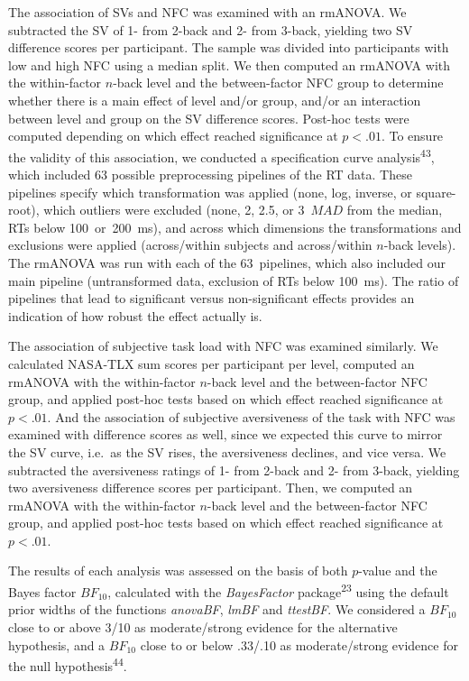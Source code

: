 \documentclass[
  man,floatsintext]{apa6}
\begin{document}
The association of SVs and NFC was examined with an rmANOVA.
We subtracted the SV of 1- from 2-back and 2- from 3-back, yielding two SV difference scores per participant.
The sample was divided into participants with low and high NFC using a median split.
We then computed an rmANOVA with the within-factor \(n\)-back level and the between-factor NFC group to determine whether there is a main effect of level and/or group, and/or an interaction between level and group on the SV difference scores.
Post-hoc tests were computed depending on which effect reached significance at \(p<.01\).
To ensure the validity of this association, we conducted a specification curve analysis\textsuperscript{43}, which included 63 possible preprocessing pipelines of the RT data.
These pipelines specify which transformation was applied (none, log, inverse, or square-root), which outliers were excluded (none, 2, 2.5, or 3~\(MAD\) from the median, RTs below 100~or~200~ms), and across which dimensions the transformations and exclusions were applied (across/within subjects and across/within \(n\)-back levels).
The rmANOVA was run with each of the 63~pipelines, which also included our main pipeline (untransformed data, exclusion of RTs below 100~ms).
The ratio of pipelines that lead to significant versus non-significant effects provides an indication of how robust the effect actually is.

The association of subjective task load with NFC was examined similarly.
We calculated NASA-TLX sum scores per participant per level, computed an rmANOVA with the within-factor \(n\)-back level and the between-factor NFC group, and applied post-hoc tests based on which effect reached significance at \(p<.01\).
And the association of subjective aversiveness of the task with NFC was examined with difference scores as well, since we expected this curve to mirror the SV curve, i.e.~as the SV rises, the aversiveness declines, and vice versa.
We subtracted the aversiveness ratings of 1- from 2-back and 2- from 3-back, yielding two aversiveness difference scores per participant.
Then, we computed an rmANOVA with the within-factor \(n\)-back level and the between-factor NFC group, and applied post-hoc tests based on which effect reached significance at \(p<.01\).

The results of each analysis was assessed on the basis of both \(p\)-value and the Bayes factor \(BF_{10}\), calculated with the \emph{BayesFactor} package\textsuperscript{23} using the default prior widths of the functions \emph{anovaBF}, \emph{lmBF} and \emph{ttestBF}.
We considered a \(BF_{10}\) close to or above 3/10 as moderate/strong evidence for the alternative hypothesis, and a \(BF_{10}\) close to or below .33/.10 as moderate/strong evidence for the null hypothesis\textsuperscript{44}.
\end{document}
